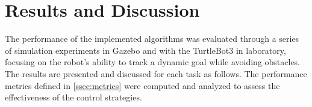 \section{Results and Discussion}
\label{sec:results}
The performance of the implemented algorithms was evaluated through a series of simulation experiments in Gazebo and with the TurtleBot3 in laboratory, focusing on the robot's ability to track a dynamic goal while avoiding obstacles. The results are presented and discussed for each task as follows. The performance metrics defined in \autoref{ssec:metrics} were computed and analyzed to assess the effectiveness of the control strategies.




